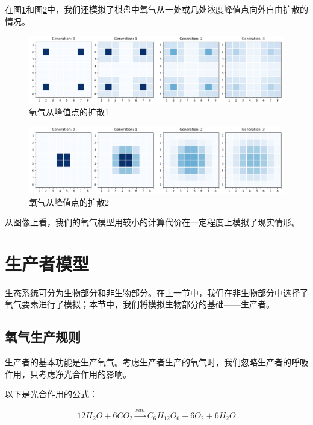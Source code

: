 \documentclass{ctexart}
\begin{document}
在图\ref{fig:oxygen-4polar-flow}和图\ref{fig:oxygen-polar-flow}中，我们还模拟了棋盘中氧气从一处或几处浓度峰值点向外自由扩散的情况。

\begin{figure}[ht]
  \centering
  \includegraphics[width=\textwidth]{oxygen-4polar-flow.png}
  \caption{氧气从峰值点的扩散1}
  \label{fig:oxygen-4polar-flow}
\end{figure}

\begin{figure}[ht]
  \centering
  \includegraphics[width=\textwidth]{oxygen-polar-flow.png}
  \caption{氧气从峰值点的扩散2}
  \label{fig:oxygen-polar-flow}
\end{figure}

从图像上看，我们的氧气模型用较小的计算代价在一定程度上模拟了现实情形。

\section{生产者模型}

生态系统可分为生物部分和非生物部分。在上一节中，我们在非生物部分中选择了氧气要素进行了模拟；本节中，我们将模拟生物部分的基础——生产者。

\subsection{氧气生产规则}

生产者的基本功能是生产氧气。考虑生产者生产的氧气时，我们忽略生产者的呼吸作用，只考虑净光合作用的影响。

以下是光合作用的公式：

\begin{equation}
  12H_2O + 6CO_2 \overset{sun}{\rightarrow} C_6H_{12}O_6 + 6O_2 + 6H_2O
  \label{equ:photosynthesis}
\end{equation}
\end{document}

